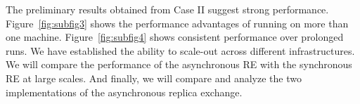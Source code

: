 \documentclass[a4paper,10pt]{article}
\newcommand{\jhanote}[1]{ {\textcolor{red} { ***shantenu: #1 }}}
\newcommand{\athotanote}[1]{ {\textcolor{green} { ***athota: #1 }}}
\newcommand{\jhanote}[1]{}
\newcommand{\athotanote}[1]{}
\begin{document}
 
The preliminary results obtained from Case II suggest strong
performance. Figure~\ref{fig:subfig3} shows the performance advantages of running on more than one machine. Figure~\ref{fig:subfig4} shows consistent performance over prolonged runs.
We have established the ability to scale-out across different
infrastructures. We will compare the performance of the asynchronous
RE with the synchronous RE at large scales. And finally, we will
compare and analyze the two implementations of the asynchronous
replica exchange.


 
  
 
\end{document}
